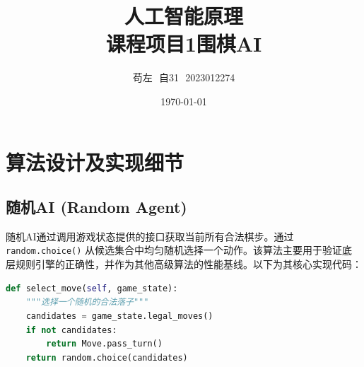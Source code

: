 \documentclass[12pt,a4paper]{ctexart}
\title{\textbf{人工智能原理\\课程项目1\quad 围棋AI}}
\author{苟左\,\, 自31\,\, 2023012274}
\date{\today}
\begin{document}
\maketitle

\section{算法设计及实现细节}
\subsection{随机AI (Random Agent)}
随机AI通过调用游戏状态提供的接口获取当前所有合法棋步。通过 \texttt{random.choice()} 从候选集合中均匀随机选择一个动作。该算法主要用于验证底层规则引擎的正确性，并作为其他高级算法的性能基线。以下为其核心实现代码：
\begin{lstlisting}[language=Python]
def select_move(self, game_state):
    """选择一个随机的合法落子"""
    candidates = game_state.legal_moves()
    if not candidates:
        return Move.pass_turn()
    return random.choice(candidates)
\end{lstlisting}
\end{document}
